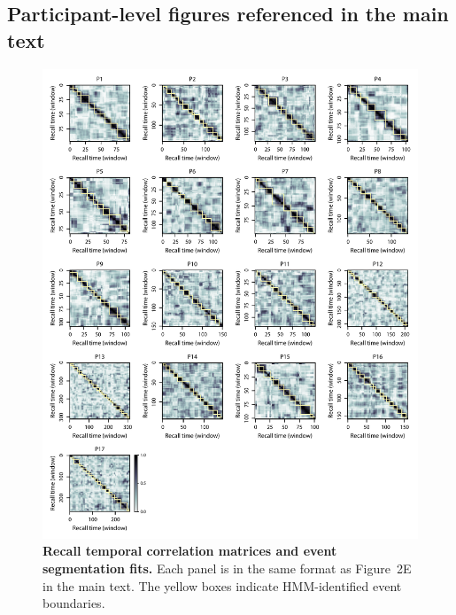 \documentclass{article}
\newcommand{\topicprops}{2}
\begin{document}
\newpage
\subsection*{Participant-level figures referenced in the main text}
\vspace*{\fill}

\begin{figure}[p!]
\centering
\includegraphics[width=\textwidth]{figs/corrmats}
\caption{\small \textbf{Recall temporal correlation matrices and event segmentation fits.} Each panel is in the same format as Figure~\topicprops E in the main text.  The yellow boxes indicate HMM-identified event boundaries.}
\label{fig:corrmats}
\end{figure}
\end{document}
